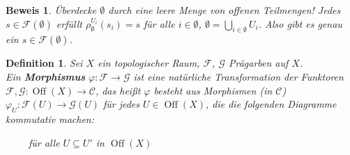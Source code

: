 \documentclass[paper = A4, fontsize=12pt, numbers=noendperiod, chapterprefix=true]{scrbook}
\theoremstyle{break}
\newtheorem{Def}{Definition}[section]
\theoremstyle{nonumberbreak}
\newtheorem{bew}{Beweis}
\theoremstyle{nonumberplain}
\newcommand{\emp}[1]{\textbf{\emph{#1}}}
\newcommand{\defterm}[1]{{\index{#1}}\emp{#1}}
\newcommand{\schraffiert}{\ensuremath{\nicefrac{\nicefrac{}{}}{\nicefrac{}{}}}}
\DeclareMathOperator{\Off}{Off}
\begin{document}
\begin{bew}
\"Uberdecke $\emptyset$ durch eine leere Menge von offenen Teilmengen! Jedes $s\in\mathcal F(\emptyset)$ erf\"ullt $\rho_{\emptyset}^{U_i}(s_i) = s$ f\"ur alle $i\in \emptyset$, $\emptyset = \bigcup\limits_{i\in \emptyset} U_i$. Also gibt es genau ein $s  \in\mathcal F(\emptyset)$.
\end{bew}

\begin{Def}
Sei $X$ ein topologischer Raum, $\mathcal F$, $\mathcal G$ Pr\"agarben auf $X$.\\
Ein \defterm{Morphismus} $\varphi: \mathcal F \to \mathcal G$ ist eine nat\"urliche Transformation der Funktoren $\mathcal F, \mathcal G: \Off(X) \to \mathcal C$, das hei\ss t $\varphi$ besteht aus Morphismen (in $\mathcal C$) $\varphi_U: \mathcal F(U) \to \mathcal G(U)$ f\"ur jedes $U\in \Off(X)$, die die folgenden Diagramme kommutativ machen:
\begin{center} $\qquad$ f\"ur alle $U\subseteq U'$ in $\Off(X)$\end{center}
\end{Def}
\end{document}
